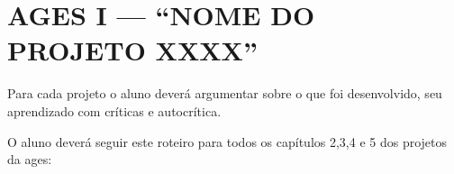\chapter[AGES I --- “NOME DO PROJETO XXXX”]{AGES I --- “NOME DO PROJETO XXXX”}

Para cada projeto o aluno deverá argumentar sobre o que foi desenvolvido,
seu aprendizado com críticas e autocrítica.

  O aluno deverá seguir este roteiro para todos os capítulos 2,3,4 e 5 dos
projetos da \ac{ages}:\




